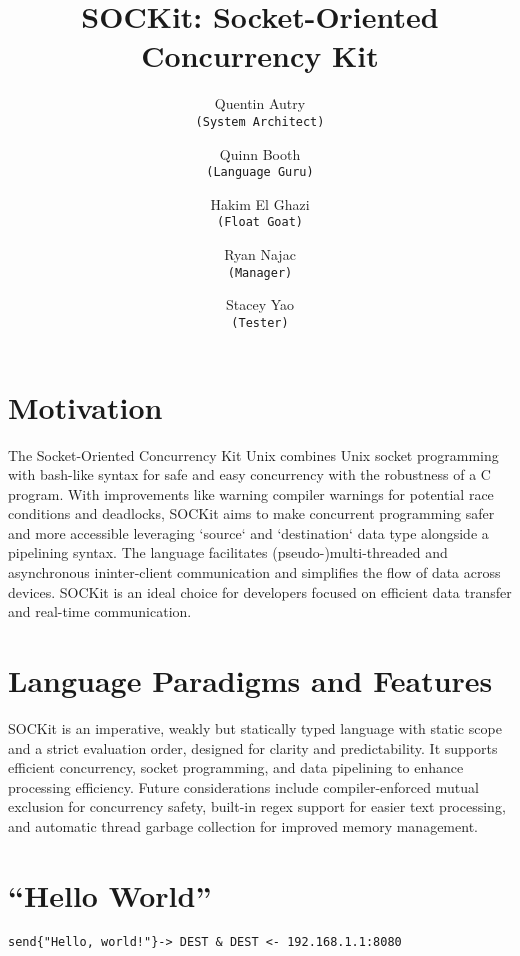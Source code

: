 \documentclass[12pt,a4paper]{article}
\title{SOCKit: Socket-Oriented Concurrency Kit}
\author{
    Quentin Autry\\
    \texttt{(System Architect)}
    \and
    Quinn Booth\\
    \texttt{(Language Guru)}
    \and
    Hakim El Ghazi\\
    \texttt{(Float Goat)}
    \and
    Ryan Najac\\
    \texttt{(Manager)}
    \and
    Stacey Yao\\
    \texttt{(Tester)}
}
\begin{document}
\maketitle

\section{Motivation}
The Socket-Oriented Concurrency Kit Unix combines Unix socket programming with bash-like syntax for safe and easy concurrency with the robustness of a C program. With improvements like warning compiler warnings for potential race conditions and deadlocks, SOCKit aims to make concurrent programming safer and more accessible leveraging `source` and `destination` data type alongside a pipelining syntax. The language facilitates (pseudo-)multi-threaded and asynchronous ininter-client communication and simplifies the flow of data across devices. SOCKit is an ideal choice for developers focused on efficient data transfer and real-time communication.

\section{Language Paradigms and Features}

SOCKit is an imperative, weakly but statically typed language with static scope and a strict evaluation order, designed for clarity and predictability. It supports efficient concurrency, socket programming, and data pipelining to enhance processing efficiency. Future considerations include compiler-enforced mutual exclusion for concurrency safety, built-in regex support for easier text processing, and automatic thread garbage collection for improved memory management.

\section{“Hello World”}
\begin{lstlisting}[numbers=none]
send{"Hello, world!"}-> DEST & DEST <- 192.168.1.1:8080
\end{lstlisting}


\newpage
\end{document}
